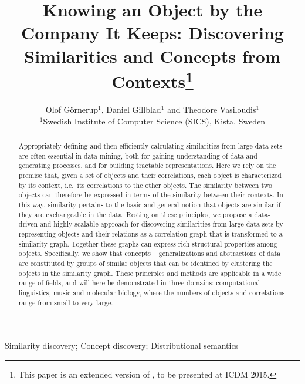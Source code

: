 \documentclass{kais}
\begin{document}
\label{firstpage}

\title{Knowing an Object by the Company It Keeps: Discovering Similarities and Concepts from 
Contexts\footnote{This paper is an extended version of \cite{Gornerup2015}, to be presented at ICDM 2015.}}

\author[O. G\"{o}rnerup et al]{Olof G\"{o}rnerup$^1$, Daniel Gillblad$^1$ and Theodore Vasiloudis$^1$\\ 
$^1$Swedish Institute of Computer Science (SICS), Kista, Sweden}

\maketitle

\begin{abstract}
Appropriately defining and then efficiently calculating similarities from large data sets are often essential
in data mining, both for gaining understanding of data and generating processes, and for building tractable representations.
Here we rely on the premise that, given a set of objects and their correlations, each object is characterized
by its context, i.e.\ its correlations to the other objects. The similarity between two objects can therefore be 
expressed in terms of the similarity between their contexts. In this way, similarity pertains to the basic 
and general notion that objects are similar if they are exchangeable in the data. Resting on these principles, we propose a 
data-driven and highly scalable approach for discovering similarities from large data sets by representing objects 
and their relations as a correlation graph that is
transformed to a similarity graph. Together these graphs can express rich structural properties
among objects. Specifically, we show that concepts -- generalizations and abstractions of
data -- are constituted by groups of similar objects that can be identified
by clustering the objects in the similarity graph.
These principles and methods are applicable in a wide range of fields, and will here be demonstrated 
in three domains: computational linguistics, music and molecular biology, where the numbers of objects and correlations
range from small to very large.
\end{abstract}

\begin{keywords}
Similarity discovery; Concept discovery; Distributional semantics
\end{keywords}
\end{document}
